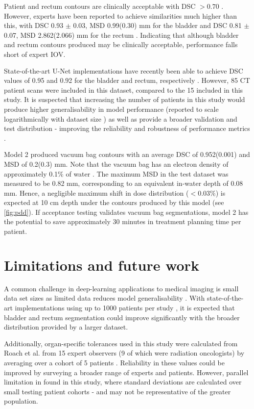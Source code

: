 Patient and rectum contours are clinically acceptable with DSC $>0.70$
\cite{Roach_2019}. However, experts have been reported to achieve similarities
much higher than this, with DSC 0.93 $\pm$ 0.03, MSD 0.99(0.30) mm for the
bladder and DSC 0.81 $\pm$ 0.07, MSD 2.862(2.066) mm for the rectum
\cite{Roach_2019}. Indicating that although bladder and rectum contours produced
may be clinically acceptable, performance falls short of expert IOV.

State-of-the-art U-Net implementations have recently been able to achieve DSC
values of 0.95 and 0.92 for the bladder and rectum, respectively
\cite{Kazemifar_2018}. However, 85 CT patient scans were included in this
dataset, compared to the 15 included in this study. It is suspected that
increasing the number of patients in this study would produce higher
generalisability in model performance (reported to scale logarithmically with
dataset size \cite{Nemoto_2020}) as well as provide a broader validation and
test distribution - improving the reliability and robustness of performance
metrics \cite{Ronneberger_2015}.

Model 2 produced vacuum bag contours with an average DSC of 0.952(0.001) and MSD
of 0.2(0.3) mm. Note that the vacuum bag has an electron density of
approximately 0.1\% of water \cite{Park}. The maximum MSD in the test dataset
was measured to be 0.82 mm, corresponding to an equivalent in-water depth of
0.08 mm. Hence, a negligible maximum shift in dose distribution ($<0.03\%$) is
expected at 10 cm depth under the contours produced by this model (see
\ref{fig:pdd}). If acceptance testing validates vacuum bag segmentations, model 2
has the potential to save approximately 30 minutes in treatment planning time
per patient.



\section{Limitations and future work}

A common challenge in deep-learning applications to medical imaging is small
data set sizes \cite{Ronneberger_2015} as limited data reduces model
generalisability \cite{Shen2017}. With state-of-the-art implementations using up
to 1000 patients per study \cite{Nikolov_2018}, it is expected that bladder and
rectum segmentation could improve significantly with the broader distribution
provided by a larger dataset.

Additionally, organ-specific tolerances used in this study were calculated from 
Roach et al. from 15 expert observers (9 of which were radiation oncologists) by
averaging over a cohort of 5 patients \cite{Roach_2019}. Reliability in these
values could be improved by surveying a broader range of experts and patients. However,
parallel limitation in found in this study, where standard deviations
are calculated over small testing patient cohorts - and may not be
representative of the greater population.

